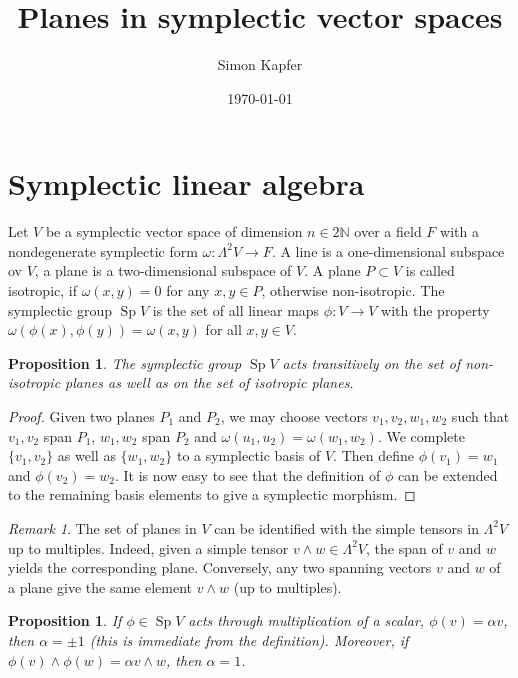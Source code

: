 \documentclass{amsart}
\DeclareMathOperator{\Sp}{Sp}
\theoremstyle{plain}
\newtheorem{proposition}[theorem]{Proposition}
\theoremstyle{definition}
\theoremstyle{remark}
\newtheorem{remark}[theorem]{Remark}
\begin{document}
\title{Planes in symplectic vector spaces}

\author{Simon Kapfer}

\date{\today}


\maketitle
\section{Symplectic linear algebra}
Let $V$ be a symplectic vector space of dimension $n\in 2\mathbb{N}$ over a field $F$ with a nondegenerate symplectic form $\omega : \Lambda^2 V \rightarrow F$. A line is a one-dimensional subspace ov $V$, a plane is a two-dimensional subspace of $V$. A plane $P\subset V$ is called isotropic, if $\omega (x,y)=0$ for any $x,y\in P$, otherwise non-isotropic.  The symplectic group $\Sp V$ is the set of all linear maps $\phi : V\rightarrow V$ with the property $\omega(\phi(x),\phi(y)) = \omega(x,y)$ for all $ x,y\in V$.
\begin{proposition}
The symplectic group $\Sp V$ acts transitively on the set of non-isotropic planes as well as on the set of isotropic planes.
\end{proposition}
\begin{proof}
Given two planes $P_1$ and $P_2$, we may choose vectors $v_1,v_2,w_1,w_2$ such that $v_1,v_2$ span $P_1$, $w_1,w_2$ span $P_2$ and $\omega(u_1,u_2) =\omega(w_1,w_2)$. We complete $\{v_1,v_2\}$ as well as $\{w_1,w_2\}$ to a symplectic basis of $V$.
Then define $\phi(v_1)=w_1$ and $\phi(v_2)=w_2$. 
It is now easy to see that the definition of $\phi$ can be extended to the remaining basis elements to give a symplectic morphism.
\end{proof}
\begin{remark}
The set of planes in $V$ can be identified with the simple tensors in $\Lambda^2V$ up to multiples. Indeed, given a simple tensor $v\wedge w \in \Lambda^2 V$, the span of $v$ and $w$ yields the corresponding plane. Conversely, any two spanning vectors $v$ and $w$ of a plane give the same element $v\wedge w$ (up to multiples).
\end{remark}
\begin{proposition}
If $\phi\in\Sp V$ acts through multiplication of a scalar, $\phi(v) = \alpha v$, then $\alpha = \pm 1$ (this is immediate from the definition). Moreover, if $\phi(v)\wedge \phi(w) = \alpha v\wedge w$, then $\alpha=1$.
\end{proposition}
\end{document}
